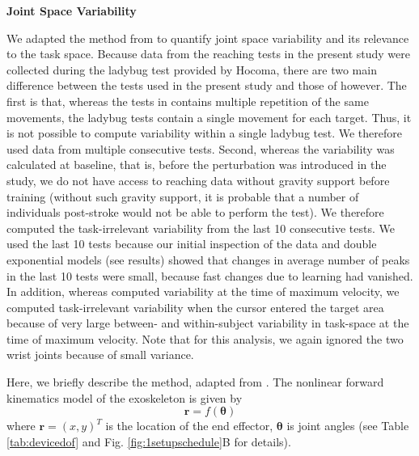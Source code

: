 \textbf{Joint Space Variability}

We adapted the method from \cite{Singh2016} to quantify joint space variability and its relevance to the task space. 
Because data from the reaching tests in the present study were collected during the ladybug test provided by Hocoma, there are two main difference between the tests used in the present study and those of \cite{Singh2016} however. 
The first is that, whereas the tests in \cite{Singh2016} contains multiple repetition of the same movements, the ladybug tests contain a single movement for each target. 
Thus, it is not possible to compute variability within a single ladybug test. 
We therefore used data from multiple consecutive tests. 
Second, whereas the variability was calculated at baseline, that is, before the perturbation was introduced in the \cite{Singh2016} study, we do not have access to reaching data without gravity support before training (without such gravity support, it is probable that a number of individuals post-stroke would not be able to perform the test). 
We therefore  computed the task-irrelevant variability from the last 10 consecutive tests. 
We used the last 10 tests because our initial inspection of the data and double exponential models (see results) showed that changes in average number of peaks in the last 10 tests were small, because fast changes due to learning had vanished. 
In addition, whereas \cite{Singh2016} computed variability at the time of maximum velocity, we computed task-irrelevant variability when the cursor entered the target area because of very large between- and within-subject variability in task-space at the time of maximum velocity.
Note that for this analysis, we again ignored the two wrist joints because of small variance. 

Here, we briefly describe the method, adapted from \cite{Singh2016}.
The nonlinear forward kinematics model of the exoskeleton is given by
	\begin{equation}\label{eqn:nonlinearForwardKinematics}
		\bm{r} = f(\bm{\theta})
	\end{equation}
where $ \bm{r} = (x,y)^T $ is the location of the end effector, $ \bm{\theta} $ is joint angles (see Table \ref{tab:devicedof} and Fig. \ref{fig:1setupschedule}B for details). 

